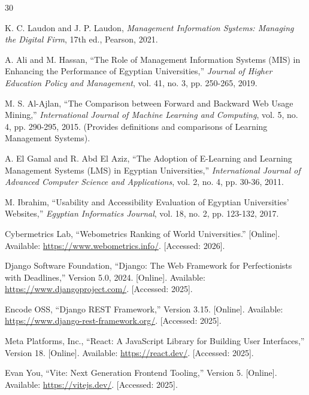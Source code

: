 
\renewcommand{\bibname}{References}
\begin{thebibliography}{30}

K. C. Laudon and J. P. Laudon, \textit{Management Information Systems: Managing the Digital Firm}, 17th ed., Pearson, 2021.

A. Ali and M. Hassan, ``The Role of Management Information Systems (MIS) in Enhancing the Performance of Egyptian Universities,'' \textit{Journal of Higher Education Policy and Management}, vol. 41, no. 3, pp. 250-265, 2019.

M. S. Al-Ajlan, ``The Comparison between Forward and Backward Web Usage Mining,'' \textit{International Journal of Machine Learning and Computing}, vol. 5, no. 4, pp. 290-295, 2015. (Provides definitions and comparisons of Learning Management Systems).

A. El Gamal and R. Abd El Aziz, ``The Adoption of E-Learning and Learning Management Systems (LMS) in Egyptian Universities,'' \textit{International Journal of Advanced Computer Science and Applications}, vol. 2, no. 4, pp. 30-36, 2011.

M. Ibrahim, ``Usability and Accessibility Evaluation of Egyptian Universities' Websites,'' \textit{Egyptian Informatics Journal}, vol. 18, no. 2, pp. 123-132, 2017.

Cybermetrics Lab, ``Webometrics Ranking of World Universities.'' [Online]. Available: \url{https://www.webometrics.info/}. [Accessed: 2026].

Django Software Foundation, ``Django: The Web Framework for Perfectionists with Deadlines,'' Version 5.0, 2024. [Online]. Available: \url{https://www.djangoproject.com/}. [Accessed: 2025].

Encode OSS, ``Django REST Framework,'' Version 3.15. [Online]. Available: \url{https://www.django-rest-framework.org/}. [Accessed: 2025].

Meta Platforms, Inc., ``React: A JavaScript Library for Building User Interfaces,'' Version 18. [Online]. Available: \url{https://react.dev/}. [Accessed: 2025].

Evan You, ``Vite: Next Generation Frontend Tooling,'' Version 5. [Online]. Available: \url{https://vitejs.dev/}. [Accessed: 2025].


\end{thebibliography}
